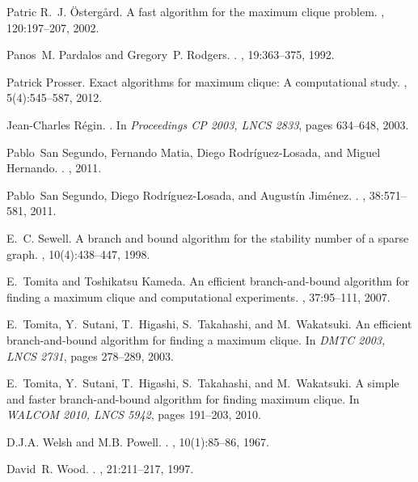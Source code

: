 \documentclass[runningheads]{llncs}
\begin{document}
\begin{thebibliography}{10}
Patric R.~J. \"{O}sterg\aa{}rd.
\newblock A fast algorithm for the maximum clique problem.
, 120:197--207, 2002.

Panos~M. Pardalos and Gregory~P. Rodgers.
.
, 19:363--375, 1992.

Patrick Prosser.
\newblock Exact algorithms for maximum clique: A computational study.
, 5(4):545--587, 2012.

Jean-Charles R\'{e}gin.
.
\newblock In {\em Proceedings {CP 2003}, LNCS 2833}, pages 634--648, 2003.

Pablo~San Segundo, Fernando Matia, Diego Rodr\'{i}guez-Losada, and Miguel
  Hernando.
.
, 2011.

Pablo~San Segundo, Diego Rodr\'{i}guez-Losada, and August\'{i}n Jim\'{e}nez.
.
, 38:571--581, 2011.

E.~C. Sewell.
\newblock A branch and bound algorithm for the stability number of a sparse
  graph.
, 10(4):438--447, 1998.

E.~Tomita and Toshikatsu Kameda.
\newblock An efficient branch-and-bound algorithm for finding a maximum clique
  and computational experiments.
, 37:95--111, 2007.

E.~Tomita, Y.~Sutani, T.~Higashi, S.~Takahashi, and M.~Wakatsuki.
\newblock An efficient branch-and-bound algorithm for finding a maximum clique.
\newblock In {\em DMTC 2003, LNCS 2731}, pages 278--289, 2003.

E.~Tomita, Y.~Sutani, T.~Higashi, S.~Takahashi, and M.~Wakatsuki.
\newblock A simple and faster branch-and-bound algorithm for finding maximum
  clique.
\newblock In {\em WALCOM 2010, LNCS 5942}, pages 191--203, 2010.

D.J.A. Welsh and M.B. Powell.
.
, 10(1):85--86, 1967.

David~R. Wood.
.
, 21:211--217, 1997.

\end{thebibliography}
\end{document}
